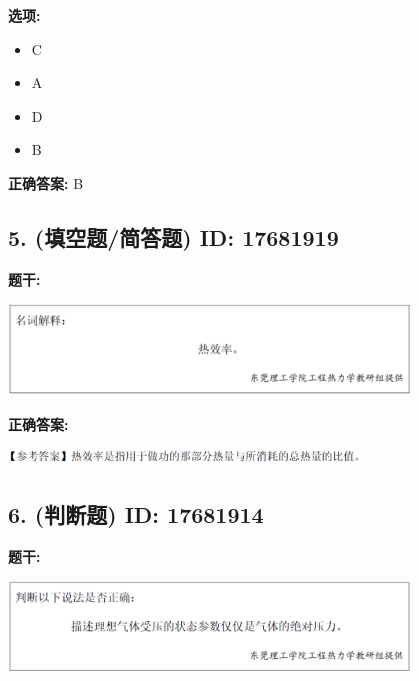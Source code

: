 \documentclass[12pt]{article}
\begin{document}
\textbf{选项:}
\begin{itemize}[leftmargin=*]
  \item C

  \item A

  \item D

  \item B

\end{itemize}

\textbf{正确答案:}
B

\vspace{0.5em}\hrulefill\vspace{1em}

\subsection*{5. (填空题/简答题) \small ID: 17681919}

\textbf{题干:}


\begin{center}\includegraphics[width=0.8\textwidth, height=0.25\textheight, keepaspectratio]{question_5_17681919/title_img_1.png}\end{center}

\textbf{正确答案:}

\begin{center}\includegraphics[width=0.7\textwidth, height=0.2\textheight, keepaspectratio]{question_5_17681919/correct_answer_1_img_1.png}\end{center}

\vspace{0.5em}\hrulefill\vspace{1em}

\subsection*{6. (判断题) \small ID: 17681914}

\textbf{题干:}


\begin{center}\includegraphics[width=0.8\textwidth, height=0.25\textheight, keepaspectratio]{question_6_17681914/title_img_1.png}\end{center}
\end{document}
